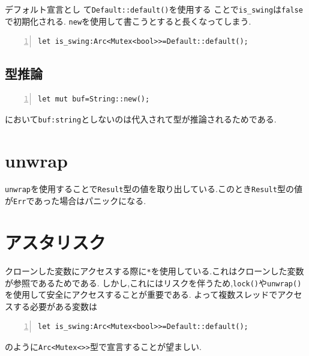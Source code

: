 デフォルト宣言とし
て\verb|Default::default()|を使用する
ことで\verb|is_swing|は\verb|false|で初期化される.
\verb|new|を使用して書こうとすると長くなってしまう.
\begin{Verbatim}[numbers=left, xleftmargin=10mm, numbersep=6pt,
                    fontsize=\small, baselinestretch=0.8]
let is_swing:Arc<Mutex<bool>>=Default::default();

\end{Verbatim}

\subsection{型推論}
\begin{Verbatim}[numbers=left, xleftmargin=10mm, numbersep=6pt,
                    fontsize=\small, baselinestretch=0.8]
let mut buf=String::new();
\end{Verbatim}

において\verb|buf:string|としないのは代入されて型が推論されるためである.

\section{unwrap}
\verb|unwrap|を使用することで\verb|Result|型の値を取り出している.このとき\verb|Result|型の値が\verb|Err|であった場合はパニックになる.

\section{アスタリスク}
クローンした変数にアクセスする際に\verb|*|を使用している.これはクローンした変数が参照であるためである.
しかし,これにはリスクを伴うため,\verb|lock()|や\verb|unwrap()|を使用して安全にアクセスすることが重要である.
よって複数スレッドでアクセスする必要がある変数は
\begin{Verbatim}[numbers=left, xleftmargin=10mm, numbersep=6pt,
                    fontsize=\small, baselinestretch=0.8]
let is_swing:Arc<Mutex<bool>>=Default::default();
\end{Verbatim}
のように\verb|Arc<Mutex<>>|型で宣言することが望ましい.









